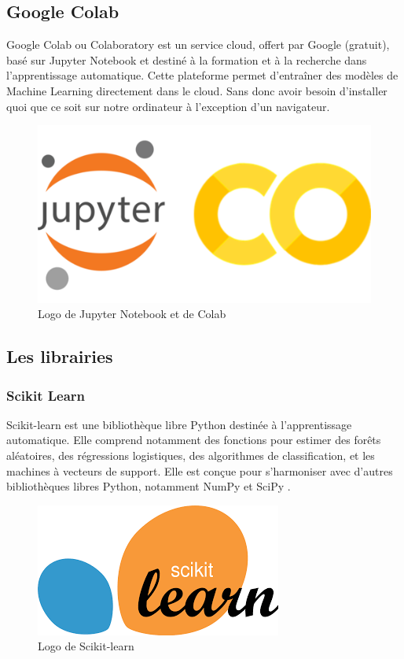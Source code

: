 \documentclass[12pt, openany]{report}
\begin{document}
\subsection{Google Colab}

Google Colab  ou Colaboratory est un service cloud, offert par Google (gratuit), basé sur Jupyter Notebook et destiné à la formation et à la recherche dans l’apprentissage automatique. Cette plateforme permet d’entraîner des modèles de Machine Learning directement dans le cloud. Sans donc avoir besoin d’installer quoi que ce soit sur notre ordinateur à l’exception d’un navigateur.

\begin{figure}[H]
\centering
\includegraphics[scale=2.5]{colab.png}
\caption{Logo de Jupyter Notebook et de Colab}
\end{figure}

\subsection{Les librairies}

\subsubsection{Scikit Learn}
Scikit-learn est une bibliothèque libre Python destinée à l'apprentissage automatique. Elle comprend notamment des fonctions pour estimer des forêts aléatoires, des régressions logistiques, des algorithmes de classification, et les machines à vecteurs de support. Elle est conçue pour s'harmoniser avec d'autres bibliothèques libres Python, notamment NumPy et SciPy .

\begin{figure}[H]
\centering
\includegraphics[scale=0.7]{skit.png}
\caption{Logo de Scikit-learn}
\end{figure}
\end{document}
